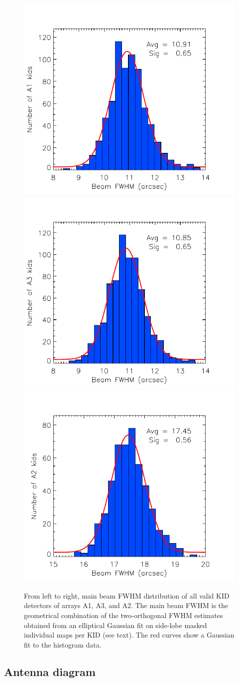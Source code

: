\documentclass[]{aa} %
\begin{document}
\begin{figure}[h]
  \centering
  \includegraphics[clip=true,width=0.33\linewidth]{plot_histo_A1_fwhm_20170424s123.pdf}
  \includegraphics[clip=true,width=0.33\linewidth]{plot_histo_A3_fwhm_20170424s123.pdf}
  \includegraphics[clip=true,width=0.33\linewidth]{plot_histo_A2_fwhm_20170424s123.pdf}
  
\caption{From left to right, main beam FWHM distribution of all valid KID detectors of arrays A1, A3, and A2. The main beam FWHM is the geometrical combination of the two-orthogonal FWHM estimates obtained from an elliptical Gaussian fit on side-lobe masked individual maps per KID (see text). The red curves show a Gaussian fit to the histogram data.}
  \label{fig:focalplane_histo}
\end{figure}

\subsection{Antenna diagram}
\end{document}
